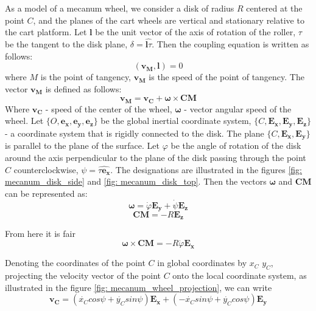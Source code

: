 \documentclass[oneside,final,14pt]{extreport}
\newcommand{\bs}{\boldsymbol}
\begin{document}
\begin{figure} [H]
\end{figure}

 As a model of a mecanum wheel, we consider a disk of radius $ R $ centered at the point $ C $, and the planes of the cart wheels are vertical and stationary relative to the cart platform. Let $ \bs{l} $ be the unit vector of the axis of rotation of the roller, $ \tau $ be the tangent to the disk plane, $ \delta = \widehat{\bs{l} \tau} $. Then the coupling equation is written as follows:
\begin{equation}
(
\bs{v_{M}}
,
\bs{l}
)
=
0
\end{equation}
where $ M $ is the point of tangency, $ \bs{v_{M}} $ is the speed of the point of tangency. The vector $ \bs{v_{M}} $ is defined as follows:
\begin{equation}
\bs{v_{M}}
=
\bs{v_{C}}
+
\bs{\omega}
\times
\bs{CM}
\end{equation}
Where
$ \bs{v_{C}} $ -
speed of the center of the wheel, $ \bs{\omega} $ - vector angular speed of the wheel.
Let $ \{O, \bs{e_{x}}, \bs{e_{y}}, \bs{e_{z}} \} $ be the global inertial coordinate system, $ \{C, \bs{E_{x}}, \bs{E_{y}}, \bs{E_{z}} \} $ - a coordinate system that is rigidly connected to the disk. The plane $ \{C, \bs{E_{x}}, \bs{E_{y}} \} $ is parallel to the plane of the surface. Let $ \varphi $ be the angle of rotation of the disk around the axis perpendicular to the plane of the disk passing through the point $ C $ counterclockwise, $ \psi = \widehat{\tau \bs{e_{x}}} $. The designations are illustrated in the figures \ref{fig: mecanum_disk_side} and \ref{fig: mecanum_disk_top}. Then the vectors $ \bs{\omega} $ and $ \bs{CM} $ can be represented as:
\begin{equation}
\bs{\omega}
=
\dot{\varphi}
\bs{E_{y}}
+
\dot{\psi}
\bs{E_{z}}
\end{equation}
\begin{equation}
\bs{CM}
=
-R
\bs{E_{z}}
\end{equation}

From here it is fair
\begin{equation}
\bs{\omega}
\times
\bs{CM}
=
-R \dot{\varphi}
\bs{E_{x}}
\end{equation}

Denoting the coordinates of the point $ C $ in global coordinates by $ x_{C} $ $ y_{C} $, projecting the velocity vector of the point $ C $ onto the local coordinate system, as illustrated in the figure \ref{fig: mecanum_wheel_projection}, we can write
\begin{equation}
\label{eq: velocity_c_projection}
\bs{v_{C}}
=
(
\dot{x_{C}}
cos \psi
+
\dot{y_{C}}
sin \psi
)
\bs{E_{x}}
+
(
- \dot{x_{C}}
sin \psi
+
\dot{y_{C}}
cos \psi
)
\bs{E_{y}}
\end{equation}
\end{document}
